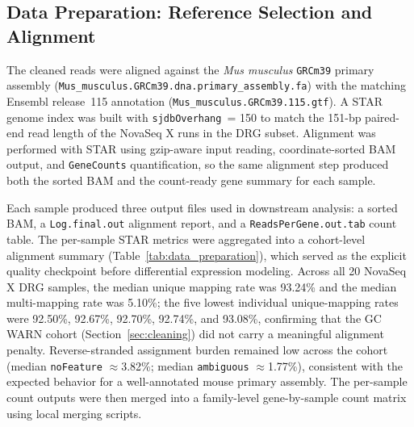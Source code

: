 \documentclass[12pt]{article}
\begin{document}
\subsection{Data Preparation: Reference Selection and Alignment}
\label{sec:preparation}

The cleaned reads were aligned against the \textit{Mus musculus} \texttt{GRCm39} primary
assembly (\texttt{Mus\_musculus.GRCm39.dna.primary\_assembly.fa}) with the matching Ensembl
release~115 annotation (\texttt{Mus\_musculus.GRCm39.115.gtf}).
A STAR genome index was built with \texttt{sjdbOverhang}~= 150 to match the 151-bp paired-end
read length of the NovaSeq X runs in the DRG subset.
Alignment was performed with STAR using gzip-aware input reading, coordinate-sorted BAM output,
and \texttt{GeneCounts} quantification, so the same alignment step produced both the sorted BAM
and the count-ready gene summary for each sample.

Each sample produced three output files used in downstream analysis: a sorted BAM, a
\texttt{Log.final.out} alignment report, and a \texttt{ReadsPerGene.out.tab} count table.
The per-sample STAR metrics were aggregated into a cohort-level alignment summary
(Table~\ref{tab:data_preparation}), which served as the explicit quality checkpoint before
differential expression modeling.
Across all 20 NovaSeq X DRG samples, the median unique mapping rate was 93.24\% and the median
multi-mapping rate was 5.10\%; the five lowest individual unique-mapping rates were
92.50\%, 92.67\%, 92.70\%, 92.74\%, and 93.08\%, confirming that the GC WARN cohort
(Section~\ref{sec:cleaning}) did not carry a meaningful alignment penalty.
Reverse-stranded assignment burden remained low across the cohort
(median \texttt{noFeature} $\approx$3.82\%; median \texttt{ambiguous} $\approx$1.77\%),
consistent with the expected behavior for a well-annotated mouse primary assembly.
The per-sample count outputs were then merged into a family-level gene-by-sample count matrix
using local merging scripts.
\end{document}
